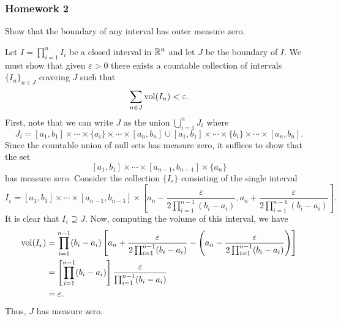 \subsubsection{Homework 2}
\setcounter{exercise}{0}
\setcounter{equation}{0}

\begin{problem}
  Show that the boundary of any interval has outer measure zero.
\end{problem}
\begin{solution}
  Let \(I=\prod_{i=1}^n I_i\) be a closed interval in \(\mathbb{R}^n\) and let
  \(J\) be the boundary of \(I\). We must show that given \(\varepsilon>0\)
  there exists a countable collection of intervals \(\{I_n\}_{n\in J}\)
  covering \(J\) such that
  \[
    \sum_{n\in J}\operatorname{vol}(I_n)<\varepsilon.
  \]
  First, note that we can write \(J\) as the union \(\bigcup_{i=1}^n J_i\)
  where
  \[
    J_i=%
      [a_1,b_1]\times\cdots\times\{a_i\}\times\cdots\times[a_n,b_n]%
    \cup
    [a_1,b_1]\times\cdots\times\{b_i\}\times\cdots\times[a_n,b_n].
  \]
  Since the countable union of null sets has measure zero, it suffices to
  show that the set
  \[
    [a_1,b_1]\times\cdots\times[a_{n-1},b_{n-1}]\times\{a_n\}%
  \]
  has measure zero. Consider the collection \(\{I_\varepsilon\}\)
  consisting of the single interval
  \[
    I_\varepsilon= [a_1,b_1]\times\cdots\times[a_{n-1},b_{n-1}]
    \times\left[a_n-\frac{\varepsilon}{2\prod_{i=1}^{n-1}(b_i-a_i)},
      a_n+\frac{\varepsilon}{2\prod_{i=1}^{n-1}(b_i-a_i)}\right].
  \]
  It is clear that \(I_\varepsilon\supseteq J\). Now, computing the volume
  of this interval, we have
  \begin{align*}
    \vol(I_\varepsilon)%
    &=\prod_{i=1}^{n-1}(b_i-a_i)%
    \left[%
    a_n+\frac{\varepsilon}{2\prod_{i=1}^{n-1}(b_i-a_i)}%
    -\left(%
    a_n -\frac{\varepsilon}{2\prod_{i=1}^{n-1}(b_i-a_i)} \right)
    \right]\\
    &=\left[\prod_{i=1}^{n-1}(b_i-a_i)\right]%
      \frac{\varepsilon}{\prod_{i=1}^{n-1}(b_i-a_i)}\\
    &=\varepsilon.
  \end{align*}
  Thus, \(J\) has measure zero.
\end{solution}


